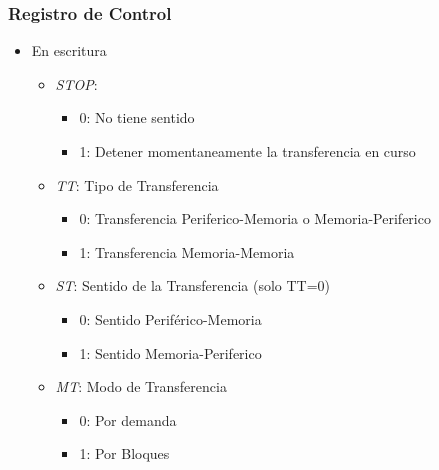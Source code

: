 \documentclass{beamer}
\begin{document}
\begin{frame}
\frametitle{Registro de Control}
  \begin{itemize}
     \item En escritura
     \begin{itemize}
        \item \emph{STOP}:
	  \begin{itemize}
	      \item 0: No tiene sentido
	      \item 1: Detener momentaneamente la transferencia en curso
	  \end{itemize}
        \item \emph{TT}: Tipo de Transferencia
	  \begin{itemize}
	      \item 0: Transferencia Periferico-Memoria o Memoria-Periferico
	      \item 1: Transferencia Memoria-Memoria
	  \end{itemize}
        \item \emph{ST}: Sentido de la Transferencia (solo TT=0)
	  \begin{itemize}
	      \item 0: Sentido Periférico-Memoria
	      \item 1: Sentido Memoria-Periferico
	  \end{itemize}
        \item \emph{MT}: Modo de Transferencia
	  \begin{itemize}
	      \item 0: Por demanda
	      \item 1: Por Bloques
	  \end{itemize}

     \end{itemize}
  \end{itemize}
\end{frame}
\end{document}
